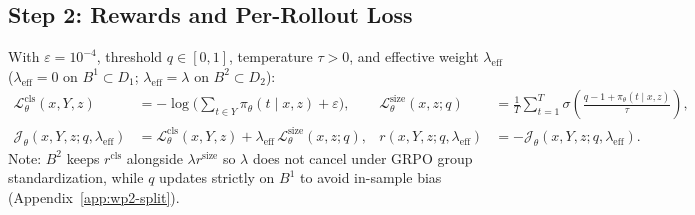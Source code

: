 \documentclass[10pt,a4paper]{article}
\newcommand{\Lcls}{\mathcal{L}^{\mathrm{cls}}}
\newcommand{\Lsize}{\mathcal{L}^{\mathrm{size}}}
\begin{document}
\subsection{Step 2: Rewards and Per-Rollout Loss}
With $\varepsilon=10^{-4}$, threshold $q\in[0,1]$, temperature $\tau>0$, and effective weight $\lambda_{\mathrm{eff}}$ ($\lambda_{\mathrm{eff}}=0$ on $B^1\subset D_1$; $\lambda_{\mathrm{eff}}=\lambda$ on $B^2\subset D_2$):
\begin{align}
\Lcls_\theta(x,Y,z) &= -\log\!\Big(\sum_{t\in Y}\pi_\theta(t\mid x,z)+\varepsilon\Big), &
\Lsize_\theta(x,z;q) &= \frac{1}{T}\sum_{t=1}^{T}\sigma\!\left(\frac{q - 1 + \pi_\theta(t\mid x,z)}{\tau}\right), \label{eq:wp2-terms}\\
\mathcal{J}_\theta(x,Y,z;q,\lambda_{\mathrm{eff}}) &= \Lcls_\theta(x,Y,z) + \lambda_{\mathrm{eff}}\,\Lsize_\theta(x,z;q), &
r(x,Y,z;q,\lambda_{\mathrm{eff}}) &= -\mathcal{J}_\theta(x,Y,z;q,\lambda_{\mathrm{eff}}). \label{eq:wp2-comb}
\end{align}
Note: $B^2$ keeps $r^{\mathrm{cls}}$ alongside $\lambda r^{\mathrm{size}}$ so $\lambda$ does not cancel under GRPO group standardization, while $q$ updates strictly on $B^1$ to avoid in-sample bias (Appendix~\ref{app:wp2-split}).
\end{document}
